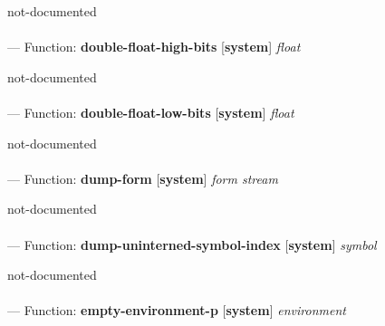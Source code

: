 \begin{adjustwidth}{5em}{5em}
not-documented
\end{adjustwidth}

\paragraph{}
\label{SYSTEM:DOUBLE-FLOAT-HIGH-BITS}
--- Function: \textbf{double-float-high-bits} [\textbf{system}] \textit{float}

\begin{adjustwidth}{5em}{5em}
not-documented
\end{adjustwidth}

\paragraph{}
\label{SYSTEM:DOUBLE-FLOAT-LOW-BITS}
--- Function: \textbf{double-float-low-bits} [\textbf{system}] \textit{float}

\begin{adjustwidth}{5em}{5em}
not-documented
\end{adjustwidth}

\paragraph{}
\label{SYSTEM:DUMP-FORM}
--- Function: \textbf{dump-form} [\textbf{system}] \textit{form stream}

\begin{adjustwidth}{5em}{5em}
not-documented
\end{adjustwidth}

\paragraph{}
\label{SYSTEM:DUMP-UNINTERNED-SYMBOL-INDEX}
--- Function: \textbf{dump-uninterned-symbol-index} [\textbf{system}] \textit{symbol}

\begin{adjustwidth}{5em}{5em}
not-documented
\end{adjustwidth}

\paragraph{}
\label{SYSTEM:EMPTY-ENVIRONMENT-P}
--- Function: \textbf{empty-environment-p} [\textbf{system}] \textit{environment}


